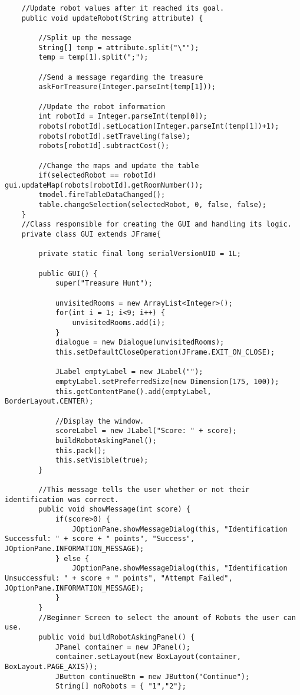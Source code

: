 \begin{lstlisting}
  	//Update robot values after it reached its goal.
  	public void updateRobot(String attribute) {

  		//Split up the message
  		String[] temp = attribute.split("\"");
		temp = temp[1].split(";");

		//Send a message regarding the treasure
		askForTreasure(Integer.parseInt(temp[1]));

		//Update the robot information
		int robotId = Integer.parseInt(temp[0]);
		robots[robotId].setLocation(Integer.parseInt(temp[1])+1);
		robots[robotId].setTraveling(false);
		robots[robotId].subtractCost();

		//Change the maps and update the table
		if(selectedRobot == robotId) gui.updateMap(robots[robotId].getRoomNumber());
		tmodel.fireTableDataChanged();
		table.changeSelection(selectedRobot, 0, false, false);
  	}
  	//Class responsible for creating the GUI and handling its logic.
  	private class GUI extends JFrame{
  		
  		private static final long serialVersionUID = 1L;

		public GUI() {
			super("Treasure Hunt");

			unvisitedRooms = new ArrayList<Integer>();
			for(int i = 1; i<9; i++) {
				unvisitedRooms.add(i);
			}
			dialogue = new Dialogue(unvisitedRooms);
	        this.setDefaultCloseOperation(JFrame.EXIT_ON_CLOSE);
	 
	        JLabel emptyLabel = new JLabel("");
	        emptyLabel.setPreferredSize(new Dimension(175, 100));
	        this.getContentPane().add(emptyLabel, BorderLayout.CENTER);
	 
	        //Display the window.
	        scoreLabel = new JLabel("Score: " + score);
	        buildRobotAskingPanel();
	        this.pack();
	        this.setVisible(true);
		}

		//This message tells the user whether or not their identification was correct.
		public void showMessage(int score) {
			if(score>0) {
    			JOptionPane.showMessageDialog(this, "Identification Successful: " + score + " points", "Success", JOptionPane.INFORMATION_MESSAGE);
    		} else {
    			JOptionPane.showMessageDialog(this, "Identification Unsuccessful: " + score + " points", "Attempt Failed", JOptionPane.INFORMATION_MESSAGE);
    		}
		}
		//Beginner Screen to select the amount of Robots the user can use.
		public void buildRobotAskingPanel() {
			JPanel container = new JPanel();
			container.setLayout(new BoxLayout(container, BoxLayout.PAGE_AXIS));
			JButton continueBtn = new JButton("Continue");
			String[] noRobots = { "1","2"};


\end{lstlisting}
